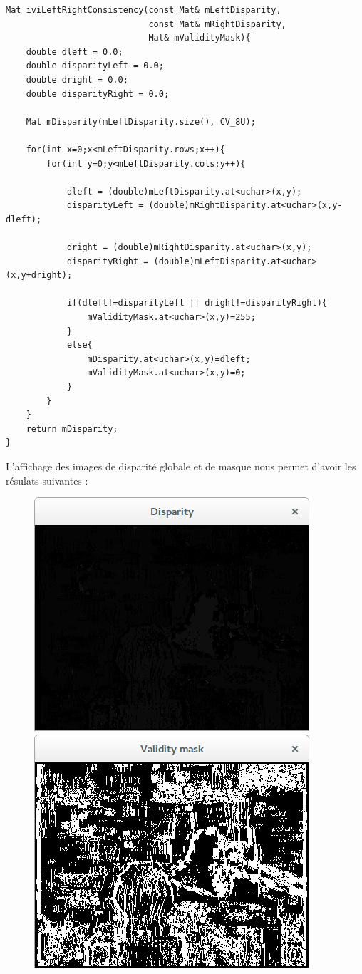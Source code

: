 \documentclass[a4paper,12pt]{report}
\begin{document}
\begin{lstlisting}[style=C++]
Mat iviLeftRightConsistency(const Mat& mLeftDisparity,
                            const Mat& mRightDisparity,
                            Mat& mValidityMask){
    double dleft = 0.0;
    double disparityLeft = 0.0;
    double dright = 0.0;
    double disparityRight = 0.0;

    Mat mDisparity(mLeftDisparity.size(), CV_8U);

    for(int x=0;x<mLeftDisparity.rows;x++){
        for(int y=0;y<mLeftDisparity.cols;y++){

            dleft = (double)mLeftDisparity.at<uchar>(x,y);
            disparityLeft = (double)mRightDisparity.at<uchar>(x,y-dleft);

            dright = (double)mRightDisparity.at<uchar>(x,y);
            disparityRight = (double)mLeftDisparity.at<uchar>(x,y+dright);

            if(dleft!=disparityLeft || dright!=disparityRight){
                mValidityMask.at<uchar>(x,y)=255;
            }
            else{
                mDisparity.at<uchar>(x,y)=dleft;
                mValidityMask.at<uchar>(x,y)=0;
            }
        }
    }
    return mDisparity;
}
\end{lstlisting}
\noindent L'affichage des images de disparité globale et de masque nous permet d'avoir les résulats suivantes :
\begin{figure}[!ht]
	\center
	\includegraphics[scale=0.5]{./image/disparity.png}
	\includegraphics[scale=0.5]{./image/mask.png}
\end{figure}\\
\end{document}
